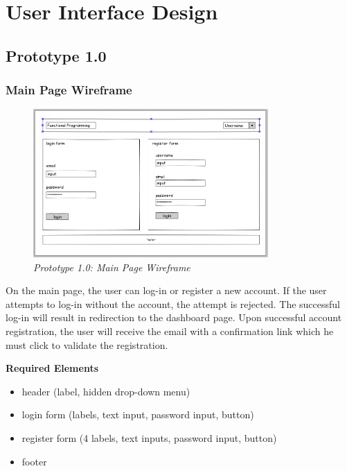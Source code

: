 \documentclass[12pt,twoside,a4paper]{report}
\begin{document}
\section{User Interface Design}\label{3.7}

\subsection{Prototype 1.0}\label{3.7.1}

\subsubsection{Main Page Wireframe}\label{3.7.1.1}
\begin{figure}[!ht]
	\centering
		\includegraphics[width=0.8\textwidth, totalheight=7cm]
		{wireframe_main_page}
	\caption{\textit{Prototype 1.0: Main Page Wireframe}}
	\label{f3.7.1.1}
\end{figure}

On the main page, the user can log-in or register a new account. If the user attempts to log-in without the account, the attempt is rejected. The successful log-in will result in redirection to the dashboard page. Upon successful account registration, the user will receive the email with a confirmation link which he must click to validate the registration.

\textbf{Required Elements}
\begin{itemize}\itemsep1pt \parskip0pt 
\item header (label, hidden drop-down menu)
\item login form (labels, text input, password input, button)
\item register form (4 labels, text inputs, password input, button)
\item footer
\end{itemize}
\end{document}
